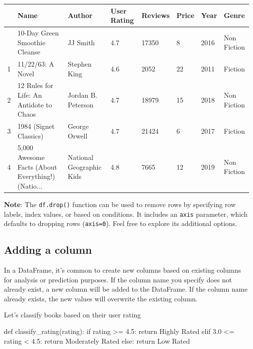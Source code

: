 \documentclass[
  letterpaper,
  DIV=11,
  numbers=noendperiod]{scrreprt}
\newenvironment{Shaded}{\begin{snugshade}}{\end{snugshade}}
\newcommand{\ControlFlowTok}[1]{\textcolor[rgb]{0.00,0.23,0.31}{#1}}
\newcommand{\FloatTok}[1]{\textcolor[rgb]{0.68,0.00,0.00}{#1}}
\newcommand{\KeywordTok}[1]{\textcolor[rgb]{0.00,0.23,0.31}{#1}}
\newcommand{\NormalTok}[1]{\textcolor[rgb]{0.00,0.23,0.31}{#1}}
\newcommand{\OperatorTok}[1]{\textcolor[rgb]{0.37,0.37,0.37}{#1}}
\newcommand{\StringTok}[1]{\textcolor[rgb]{0.13,0.47,0.30}{#1}}
\begin{document}
\begin{longtable}[]{@{}llllllll@{}}
\toprule\noalign{}
& Name & Author & User Rating & Reviews & Price & Year & Genre \\
\midrule\noalign{}
\endhead
\bottomrule\noalign{}
\endlastfoot
0 & 10-Day Green Smoothie Cleanse & JJ Smith & 4.7 & 17350 & 8 & 2016 &
Non Fiction \\
1 & 11/22/63: A Novel & Stephen King & 4.6 & 2052 & 22 & 2011 &
Fiction \\
2 & 12 Rules for Life: An Antidote to Chaos & Jordan B. Peterson & 4.7 &
18979 & 15 & 2018 & Non Fiction \\
3 & 1984 (Signet Classics) & George Orwell & 4.7 & 21424 & 6 & 2017 &
Fiction \\
4 & 5,000 Awesome Facts (About Everything!) (Natio... & National
Geographic Kids & 4.8 & 7665 & 12 & 2019 & Non Fiction \\
\end{longtable}

\textbf{Note}: The \texttt{df.drop()} function can be used to remove
rows by specifying row labels, index values, or based on conditions. It
includes an \texttt{axis} parameter, which defaults to dropping rows
(\texttt{axis=0}). Feel free to explore its additional options.

\hypertarget{adding-a-column}{%
\subsection{Adding a column}\label{adding-a-column}}

In a DataFrame, it's common to create new columns based on existing
columns for analysis or prediction purposes. If the column name you
specify does not already exist, a new column will be added to the
DataFrame. If the column name already exists, the new values will
overwrite the existing column.

Let's classify books based on their user rating

\begin{Shaded}
\begin{Highlighting}[]
\KeywordTok{def}\NormalTok{ classify\_rating(rating):}
    \ControlFlowTok{if}\NormalTok{ rating }\OperatorTok{\textgreater{}=} \FloatTok{4.5}\NormalTok{:}
        \ControlFlowTok{return} \StringTok{\textquotesingle{}Highly Rated\textquotesingle{}}
    \ControlFlowTok{elif} \FloatTok{3.0} \OperatorTok{\textless{}=}\NormalTok{ rating }\OperatorTok{\textless{}} \FloatTok{4.5}\NormalTok{:}
        \ControlFlowTok{return} \StringTok{\textquotesingle{}Moderately Rated\textquotesingle{}}
    \ControlFlowTok{else}\NormalTok{:}
        \ControlFlowTok{return} \StringTok{\textquotesingle{}Low Rated\textquotesingle{}}
\end{Highlighting}
\end{Shaded}
\end{document}
